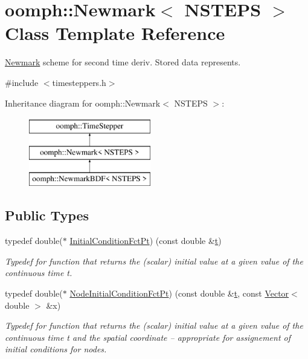 \hypertarget{classoomph_1_1Newmark}{}\section{oomph\+:\+:Newmark$<$ N\+S\+T\+E\+PS $>$ Class Template Reference}
\label{classoomph_1_1Newmark}


\hyperlink{classoomph_1_1Newmark}{Newmark} scheme for second time deriv. Stored data represents.  




{\ttfamily \#include $<$timesteppers.\+h$>$}

Inheritance diagram for oomph\+:\+:Newmark$<$ N\+S\+T\+E\+PS $>$\+:\begin{figure}[H]
\begin{center}
\leavevmode
\includegraphics[height=3.000000cm]{classoomph_1_1Newmark}
\end{center}
\end{figure}
\subsection*{Public Types}
\begin{DoxyCompactItemize}
\item 
typedef double($\ast$ \hyperlink{classoomph_1_1Newmark_a40793f69efc56441a46296ad428dc3d4}{Initial\+Condition\+Fct\+Pt}) (const double \&\hyperlink{cfortran_8h_af6f0bd3dc13317f895c91323c25c2b8f}{t})
\begin{DoxyCompactList}\small\item\em Typedef for function that returns the (scalar) initial value at a given value of the continuous time t. \end{DoxyCompactList}\item 
typedef double($\ast$ \hyperlink{classoomph_1_1Newmark_af7c5c0d8127484525f751f084aa36d67}{Node\+Initial\+Condition\+Fct\+Pt}) (const double \&\hyperlink{cfortran_8h_af6f0bd3dc13317f895c91323c25c2b8f}{t}, const \hyperlink{classoomph_1_1Vector}{Vector}$<$ double $>$ \&x)
\begin{DoxyCompactList}\small\item\em Typedef for function that returns the (scalar) initial value at a given value of the continuous time t and the spatial coordinate -- appropriate for assignement of initial conditions for nodes. \end{DoxyCompactList}\end{DoxyCompactItemize}
